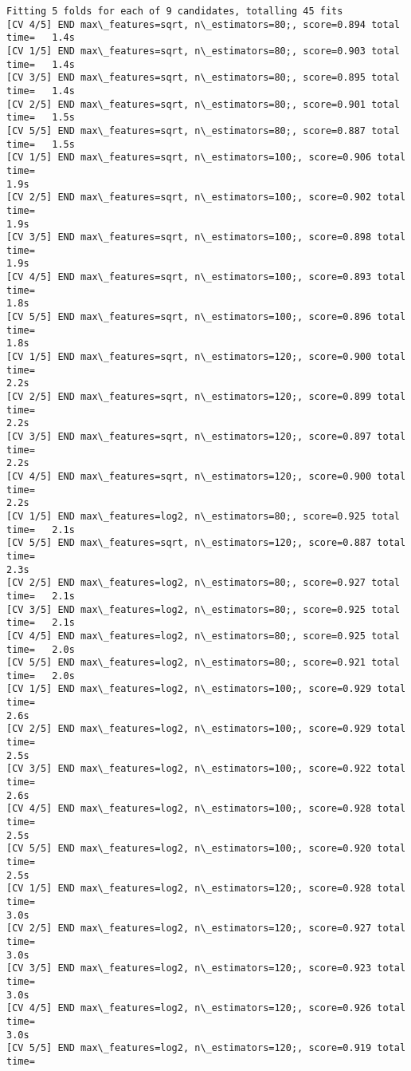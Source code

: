 \documentclass[11pt]{article}
\begin{document}
    \begin{Verbatim}[commandchars=\\\{\}]
Fitting 5 folds for each of 9 candidates, totalling 45 fits
[CV 4/5] END max\_features=sqrt, n\_estimators=80;, score=0.894 total time=   1.4s
[CV 1/5] END max\_features=sqrt, n\_estimators=80;, score=0.903 total time=   1.4s
[CV 3/5] END max\_features=sqrt, n\_estimators=80;, score=0.895 total time=   1.4s
[CV 2/5] END max\_features=sqrt, n\_estimators=80;, score=0.901 total time=   1.5s
[CV 5/5] END max\_features=sqrt, n\_estimators=80;, score=0.887 total time=   1.5s
[CV 1/5] END max\_features=sqrt, n\_estimators=100;, score=0.906 total time=
1.9s
[CV 2/5] END max\_features=sqrt, n\_estimators=100;, score=0.902 total time=
1.9s
[CV 3/5] END max\_features=sqrt, n\_estimators=100;, score=0.898 total time=
1.9s
[CV 4/5] END max\_features=sqrt, n\_estimators=100;, score=0.893 total time=
1.8s
[CV 5/5] END max\_features=sqrt, n\_estimators=100;, score=0.896 total time=
1.8s
[CV 1/5] END max\_features=sqrt, n\_estimators=120;, score=0.900 total time=
2.2s
[CV 2/5] END max\_features=sqrt, n\_estimators=120;, score=0.899 total time=
2.2s
[CV 3/5] END max\_features=sqrt, n\_estimators=120;, score=0.897 total time=
2.2s
[CV 4/5] END max\_features=sqrt, n\_estimators=120;, score=0.900 total time=
2.2s
[CV 1/5] END max\_features=log2, n\_estimators=80;, score=0.925 total time=   2.1s
[CV 5/5] END max\_features=sqrt, n\_estimators=120;, score=0.887 total time=
2.3s
[CV 2/5] END max\_features=log2, n\_estimators=80;, score=0.927 total time=   2.1s
[CV 3/5] END max\_features=log2, n\_estimators=80;, score=0.925 total time=   2.1s
[CV 4/5] END max\_features=log2, n\_estimators=80;, score=0.925 total time=   2.0s
[CV 5/5] END max\_features=log2, n\_estimators=80;, score=0.921 total time=   2.0s
[CV 1/5] END max\_features=log2, n\_estimators=100;, score=0.929 total time=
2.6s
[CV 2/5] END max\_features=log2, n\_estimators=100;, score=0.929 total time=
2.5s
[CV 3/5] END max\_features=log2, n\_estimators=100;, score=0.922 total time=
2.6s
[CV 4/5] END max\_features=log2, n\_estimators=100;, score=0.928 total time=
2.5s
[CV 5/5] END max\_features=log2, n\_estimators=100;, score=0.920 total time=
2.5s
[CV 1/5] END max\_features=log2, n\_estimators=120;, score=0.928 total time=
3.0s
[CV 2/5] END max\_features=log2, n\_estimators=120;, score=0.927 total time=
3.0s
[CV 3/5] END max\_features=log2, n\_estimators=120;, score=0.923 total time=
3.0s
[CV 4/5] END max\_features=log2, n\_estimators=120;, score=0.926 total time=
3.0s
[CV 5/5] END max\_features=log2, n\_estimators=120;, score=0.919 total time=

\end{Verbatim}
\end{document}
